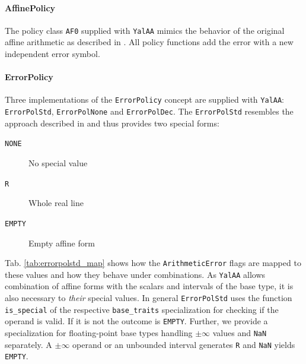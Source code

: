 \documentclass[a4]{scrartcl}
\newcommand{\yalaa}{\texttt{YalAA}\xspace}
\begin{document}
\paragraph{AffinePolicy}
\label{sec:affinepolicy}
The policy class \texttt{AF0} supplied with \yalaa mimics the behavior of the
original affine arithmetic as described in \cite{stolfi1997}. All policy
functions add the error with a new independent error symbol. 

\paragraph{ErrorPolicy}
\label{sec:errorpolicy-1}
Three implementations of the \texttt{ErrorPolicy} concept are supplied with
\yalaa: \texttt{ErrorPolStd}, \texttt{ErrorPolNone} and \texttt{ErrorPolDec}.
The \texttt{ErrorPolStd} resembles the approach described in \cite{stolfi1997}
and thus provides two special forms:
\begin{description}
  \item[\texttt{NONE}] No special value
  \item[\texttt{R}] Whole real line
  \item[\texttt{EMPTY}] Empty affine form
\end{description}
Tab. \ref{tab:errorpolstd_map} shows how the \texttt{ArithmeticError} flags
are mapped to these values and how they behave under combinations. As \yalaa
allows combination of affine forms with the scalars and intervals of the base
type, it is also necessary to \emph{their} special values. In general
\texttt{ErrorPolStd} uses the function \texttt{is\_special} of the respective
\texttt{base\_traits} specialization for checking if the operand is
valid. If it is not the outcome is \texttt{EMPTY}. Further, we provide a
specialization for floating-point base types handling $\pm \infty$
values and \texttt{NaN} separately. A $\pm \infty$ operand or an unbounded
interval generates \texttt{R} and \texttt{NaN} yields \texttt{EMPTY}.
\end{document}
